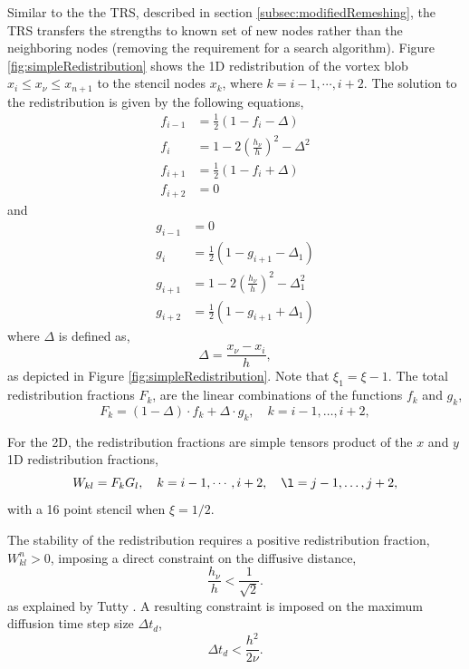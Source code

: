 Similar to the the TRS, described in section \ref{subsec:modifiedRemeshing}, the TRS transfers the strengths to known set of new nodes rather than the neighboring nodes (removing the requirement for a search algorithm). Figure \ref{fig:simpleRedistribution} shows the 1D redistribution of the vortex blob $x_i \leqslant x_{\nu} \leqslant x_{n+1}$ to the stencil nodes $x_k$, where $k=i-1,\cdots,i+2$. The solution to the redistribution is given by the following equations,
	\begin{subequations}
	\begin{align}
	f_{i-1} &= \frac{1}{2}\left(1-f_i-\Delta\right)\\
	f_i &= 1 - 2\left(\frac{h_{\nu}}{h}\right)^2 - \Delta^2\\
	f_{i+1} &= \frac{1}{2}\left(1-f_i+\Delta\right)\\
	f_{i+2} &= 0
	\end{align}
	\end{subequations}
and 	
	\begin{subequations}
	\begin{align}
	g_{i-1} &= 0\\
	g_{i} &= \frac{1}{2}\left(1-g_{i+1}-\Delta_1\right)\\
	g_{i+1} &= 1 - 2\left(\frac{h_{\nu}}{h}\right)^2 - \Delta_1^2\\
	g_{i+2} &= \frac{1}{2}\left(1-g_{i+1}+\Delta_1\right)
	\end{align}
	\end{subequations}
where $\Delta$ is defined as,
	\begin{equation}
	\Delta = \frac{x_{\nu}-x_i}{h},
	\end{equation}
as depicted in Figure \ref{fig:simpleRedistribution}. Note that $\xi_1 = \xi - 1$. The total redistribution fractions $F_k$, are the linear combinations of the functions $f_k$ and $g_k$,
	\begin{equation}
	F_k = \left(1-\Delta\right)\cdot f_k + \Delta\cdot g_k, \quad k = i-1,\dots,i+2,
	\end{equation}

For the 2D, the redistribution fractions are simple tensors product of the $x$ and $y$ 1D redistribution fractions,
	\begin{equation}
	W_{kl} = F_k G_l, \quad k = i-1,\cdots,i+2, \quad \l = j-1,\dots,j+2,
	\end{equation}
with a 16 point stencil when $\xi=1/2$.

The stability of the redistribution requires a positive redistribution fraction, $W_{kl}^n > 0$, imposing a direct constraint on the diffusive distance,
	\begin{equation}
	\frac{h_{\nu}}{h} < \frac{1}{\sqrt{2}}.
	\end{equation}
as explained by Tutty \cite{Tutty2010a}. A resulting constraint is imposed on the maximum diffusion time step size $\Delta t_d$,
	\begin{equation}
	\Delta t_d < \frac{h^2}{2\nu}.
	\label{eq:TRS_difftimeconstr}
	\end{equation}

